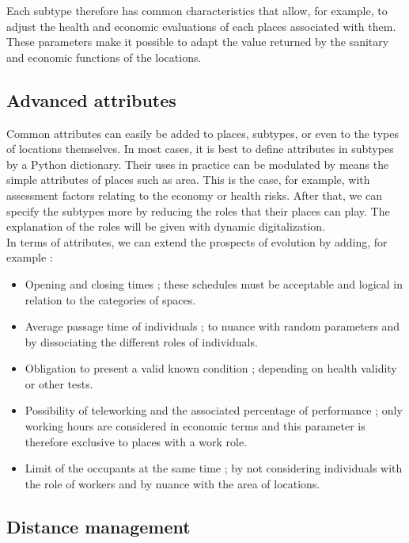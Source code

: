 Each subtype therefore has common characteristics that allow, for example, to adjust the health and economic evaluations of each places associated with them. These parameters make it possible to adapt the value returned by the sanitary and economic functions of the locations. \\

\subsection{Advanced attributes}

Common attributes can easily be added to places, subtypes, or even to the types of locations themselves. In most cases, it is best to define attributes in subtypes by a Python dictionary. Their uses in practice can be modulated by means the simple attributes of places such as area. This is the case, for example, with assessment factors relating to the economy or health risks. After that, we can specify the subtypes more by reducing the roles that their places can play. The explanation of the roles will be given with dynamic digitalization.\\

In terms of attributes, we can extend the prospects of evolution by adding, for example :\\

\begin{itemize}
\item Opening and closing times ; these schedules must be acceptable and logical in relation to the categories of spaces.
\item Average passage time of individuals ; to nuance with random parameters and by dissociating the different roles of individuals.
\item Obligation to present a valid known condition ; depending on health validity or other tests.
\item Possibility of teleworking and the associated percentage of performance ; only working hours are considered in economic terms and this parameter is therefore exclusive to places with a work role.
\item Limit of the occupants at the same time ; by not considering individuals with the role of workers and by nuance with the area of locations.\\
\end{itemize}

\subsection{Distance management}

